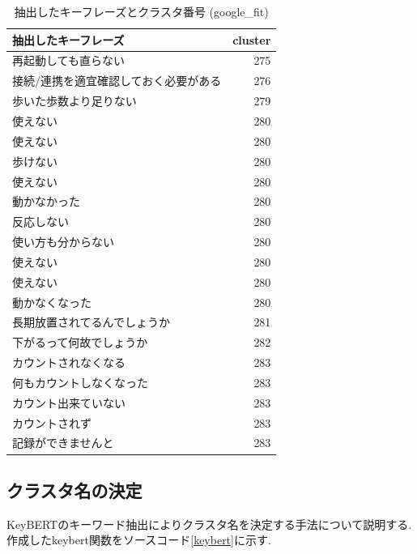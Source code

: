 \begin{table}[H]
  \caption{抽出したキーフレーズとクラスタ番号 (google\_fit) }
  \label{tb:clustering}
  \begin{center}
  \begin{tabularx}{\linewidth}{X|r}
    \hline
    抽出したキーフレーズ&cluster\\\hline\hline
    再起動しても直らない&275\\\hline
    接続/連携を適宜確認しておく必要がある&276\\\hline
    歩いた歩数より足りない&279\\\hline
    使えない&280\\\hline
    使えない&280\\\hline
    歩けない&280\\\hline
    使えない&280\\\hline
    動かなかった&280\\\hline
    反応しない&280\\\hline
    使い方も分からない&280\\\hline
    使えない&280\\\hline
    使えない&280\\\hline
    動かなくなった&280\\\hline
    長期放置されてるんでしょうか&281\\\hline
    下がるって何故でしょうか&282\\\hline
    カウントされなくなる&283\\\hline
    何もカウントしなくなった&283\\\hline
    カウント出来ていない&283\\\hline
    カウントされず&283\\\hline
    記録ができませんと&283\\\hline
  \end{tabularx}\end{center}
\end{table}

\subsection{クラスタ名の決定}
KeyBERTのキーワード抽出によりクラスタ名を決定する手法について説明する. 作成したkeybert関数をソースコード\ref{keybert}に示す. 

